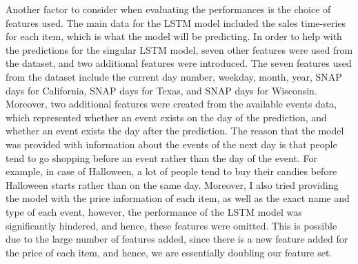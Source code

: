 Another factor to consider when evaluating the performances is the choice of features used.
The main data for the LSTM model included the sales time-series for each item, which is what the model will be predicting. 
In order to help with the predictions for the singular LSTM model, seven other features were used from the dataset, and two additional features were introduced. 
The seven features used from the dataset include the current day number, weekday, month, year, SNAP days for California, SNAP days for Texas, and SNAP days for Wisconsin. 
Moreover, two additional features were created from the available events data, which represented whether an event exists on the day of the prediction, and whether an event exists the day after the prediction.
The reason that the model was provided with information about the events of the next day is that people tend to go shopping before an event rather than the day of the event.
For example, in case of Halloween, a lot of people tend to buy their candies before Halloween starts rather than on the same day.
Moreover, I also tried providing the model with the price information of each item, as well as the exact name and type of each event, however, the performance of the LSTM model was significantly hindered, and hence, these features were omitted.
This is possible due to the large number of features added, since there is a new feature added for the price of each item, and hence, we are essentially doubling our feature set.

